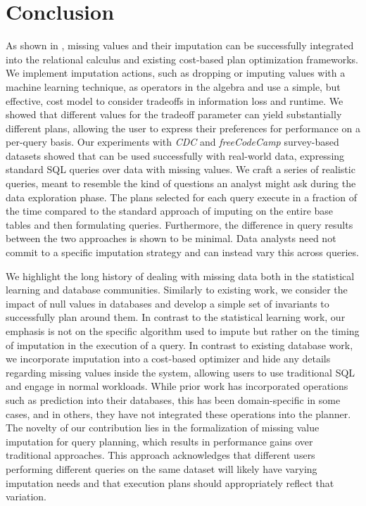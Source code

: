 \section{Conclusion}
As shown in \ProjectName{}, missing values and their imputation can be successfully integrated into the relational calculus and
existing cost-based plan optimization frameworks. We implement imputation actions, such as dropping or imputing values with a machine
learning technique, as operators in the algebra and use a simple, but effective, cost model to consider tradeoffs in 
information loss and runtime. We showed that different values for the tradeoff parameter can yield substantially
different plans, allowing the user to express their preferences for performance on a per-query basis.
Our experiments with \textit{CDC} and \textit{freeCodeCamp} survey-based datasets
showed that \ProjectName{} can be used successfully with real-world data, expressing standard SQL queries over data with missing values. 
We craft a series of realistic queries, meant to resemble the kind of questions an analyst might ask during
the data exploration phase. The plans selected for each query execute in a fraction of the time compared to the standard approach of imputing on the entire base tables and
then formulating queries. Furthermore, the difference in query results between the two approaches is
shown to be minimal. Data analysts need not commit to a specific imputation strategy and can instead
vary this across queries.

We highlight the long history of dealing with missing data both in the statistical learning and database communities.
Similarly to existing work, we consider the impact of null values in databases and develop a simple set of invariants to 
successfully plan around them. In contrast to the statistical learning work, our emphasis is not on the specific algorithm
used to impute but rather on the timing of imputation in the execution of a query. In contrast to existing database work,
we incorporate imputation into a cost-based optimizer and hide any details
regarding missing values inside the system, allowing users to use traditional SQL and engage in normal workloads.
While prior work has incorporated operations such as prediction into their databases, this has been domain-specific
in some cases, and in others, they have not integrated these operations into the planner. The novelty
of our contribution lies in the formalization of missing value imputation for query planning, which results in performance
gains over traditional approaches. This approach acknowledges that different users performing different queries on the same
dataset will likely have varying imputation needs and that execution plans should appropriately reflect that variation.

